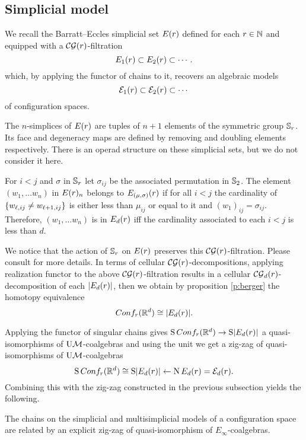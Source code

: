 
\subsection{Simplicial model}\label{ss:simplicial model}

We recall the Barratt--Eccles simplicial set $E(r)$ defined for each $r\in\mathbb{N}$ and equipped with a $\mathcal{CG}(r)$-filtration
\[
E_{1}(r) \subset E_{2}(r) \subset \dotsb.
\]
which, by applying the functor of chains to it, recovers an algebraic models
\[
\mathcal{E}_{1}(r) \subset \mathcal{E}_{2}(r) \subset \dotsb
\]
of configuration spaces.

The $n$-simplices of $E(r)$ are tuples of $n+1$ elements of the symmetric group $\mathbb{S}_r$.
Its face and degeneracy maps are defined by removing and doubling elements respectively.
There is an operad structure on these simplicial sets, but we do not consider it here.

For $i<j$ and $\sigma$ in $\mathbb{S}_r$ let $\sigma_{ij}$ be the associated permutation in $\mathbb{S}_2$.
The element $(w_1,\dots w_n)$ in $E(r)_{n}$ belongs to $E_{(\mu,\sigma)}(r)$ if for all $i<j$ the cardinality of $\{w_{\ell,ij} \neq w_{\ell+1,ij}\}$ is either less than $\mu_{ij}$ or equal to it and $(w_1)_{ij} = \sigma_{ij}$.
Therefore, $(w_1,\dots w_n)$ is in $E_{d}(r)$ iff the cardinality associated to each $i<j$ is less than $d$.

We notice that the action of $\mathbb{S}_r$ on $E(r)$ preserves this $\mathcal{CG}(r)$-filtration.
Please consult \cite{smith1989filtration,kashiwabara1993confcomplex,berger1997confspacemodel} for more details. In terms of cellular $\mathcal{CG}(r)$-decompositions, applying realization functor to the above $\mathcal{CG}(r)$-filtration results in a cellular $\mathcal{CG}_d(r)$-decomposition of each $\lvert E_{d}(r)\rvert$, then we obtain by proposition \ref{p:berger} the homotopy equivalence
$$Conf_{r}(\mathbb{R}^{d})\cong \lvert E_{d}(r)\rvert.$$

Applying the functor of singular chains gives
$\operatorname{S}Conf_{r}(\mathbb{R}^{d}) \to \operatorname{S}\lvert E_{d}(r)\rvert$
a quasi-isomorphisms of $\mathrm{U}\mathcal{M}$-coalgebras and using the unit we get a zig-zag of quasi-isomorphisms of $\mathrm{U}\mathcal{M}$-coalgebras
\begin{equation}\label{eq:simplicial zig-zag}
	\operatorname{S}Conf_{r}(\mathbb{R}^{d}) \cong
	\operatorname{S}\lvert E_d(r)\rvert \leftarrow
	\operatorname{N} E_d(r)= \mathcal{E}_d(r).
\end{equation}
Combining this with the zig-zag constructed in the previous subsection yields the following.

\begin{theorem}
	The chains on the simplicial and multisimplicial models of a configuration space are related by an explicit zig-zag of quasi-isomorphism of $E_\infty$-coalgebras.
\end{theorem}